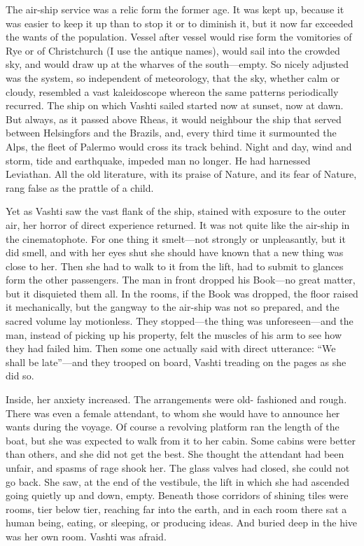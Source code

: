 The air-ship service was a relic form the former age. It was kept up, because it was easier to keep it up than to stop it or to diminish it, but it now far exceeded the wants of the population. Vessel after vessel would rise form the vomitories of Rye or of Christchurch (I use the antique names), would sail into the crowded sky, and would draw up at the wharves of the south---empty. So nicely adjusted was the system, so independent of meteorology, that the sky, whether calm or cloudy, resembled a vast kaleidoscope whereon the same patterns periodically recurred. The ship on which Vashti sailed started now at sunset, now at dawn. But always, as it passed above Rheas, it would neighbour the ship that served between Helsingfors and the Brazils, and, every third time it surmounted the Alps, the fleet of Palermo would cross its track behind. Night and day, wind and storm, tide and earthquake, impeded man no longer. He had harnessed Leviathan. All the old literature, with its praise of Nature, and its fear of Nature, rang false as the prattle of a child.

Yet as Vashti saw the vast flank of the ship, stained with exposure to the outer air, her horror of direct experience returned. It was not quite like the air-ship in the cinematophote. For one thing it smelt---not strongly or unpleasantly, but it did smell, and with her eyes shut she should have known that a new thing was close to her. Then she had to walk to it from the lift, had to submit to glances form the other passengers. The man in front dropped his Book---no great matter, but it disquieted them all. In the rooms, if the Book was dropped, the floor raised it mechanically, but the gangway to the air-ship was not so prepared, and the sacred volume lay motionless. They stopped---the thing was unforeseen---and the man, instead of picking up his property, felt the muscles of his arm to see how they had failed him. Then some one actually said with direct utterance: ``We shall be late''---and they trooped on board, Vashti treading on the pages as she did so.

Inside, her anxiety increased. The arrangements were old- fashioned and rough. There was even a female attendant, to whom she would have to announce her wants during the voyage. Of course a revolving platform ran the length of the boat, but she was expected to walk from it to her cabin. Some cabins were better than others, and she did not get the best. She thought the attendant had been unfair, and spasms of rage shook her. The glass valves had closed, she could not go back. She saw, at the end of the vestibule, the lift in which she had ascended going quietly up and down, empty. Beneath those corridors of shining tiles were rooms, tier below tier, reaching far into the earth, and in each room there sat a human being, eating, or sleeping, or producing ideas. And buried deep in the hive was her own room. Vashti was afraid.

